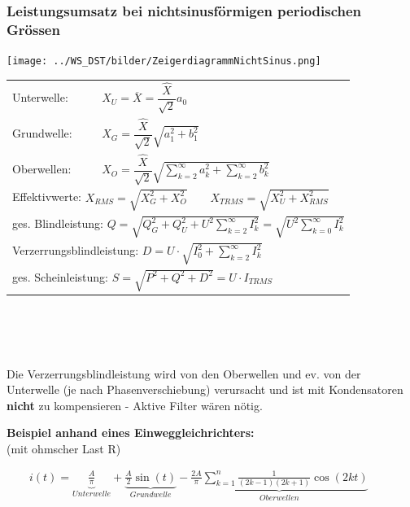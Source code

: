 		\subsubsection{Leistungsumsatz bei nichtsinusf\"ormigen periodischen Gr\"ossen}
		\begin{minipage}[c]{7.5cm}
			\texttt{[image: ../WS\_DST/bilder/ZeigerdiagrammNichtSinus.png]}     
    	\end{minipage}
		\begin{minipage}[c]{10.5cm}   
    		\noindent
    		\renewcommand{\arraystretch}{2.5}
    		\begin{tabular}{p{1.8cm} p{5.6cm}}
        		Unterwelle: 
        		& $X_{U} = \overline{X} = \dfrac{\hat{X}}{\sqrt{2}} a_0 \qquad $  \\
	     		Grundwelle: 
	     		& $X_{G} = \dfrac{\hat{X}}{\sqrt{2}} \sqrt{a_1^2 + b_1^2} \qquad  $   \\
	     		Oberwellen: 
	     		& $X_{O} = \dfrac{\hat{X}}{\sqrt{2}}
	     		\sqrt{\sum\limits_{k=2}^{\infty}a_k^2 +\sum\limits_{k=2}^{\infty}b_k^2}
	     		\qquad $  \\ \multicolumn{2}{l}{Effektivwerte: $X_{RMS} = \sqrt{X_G^2 + X_O^2} \qquad X_{TRMS} =
	     		\sqrt{X_U^2 + X_{RMS}^2}$ } \\
		\multicolumn{2}{l}{ges. Blindleistung: $Q = \sqrt{Q_G^2 + Q_U^2 + U^2
		\sum\limits_{k=2}^{\infty}I_k^2} = \sqrt{U^2 \sum\limits_{k=0}^{\infty}I_k^2}$} \\ 
		\multicolumn{2}{l}{Verzerrungsblindleistung: $D = U
		\cdot \sqrt{I_0^2 + \sum\limits_{k=2}^{\infty}I_k^2}$} \\
		\multicolumn{2}{l}{ges. Scheinleistung: $S = \sqrt{P^2 + Q^2 + D^2} = U \cdot I_{TRMS}$} \\
		 \end{tabular} \\
		 \renewcommand{\arraystretch}{1}
     	\end{minipage}    		\\ \\
     	Die Verzerrungsblindleistung wird von den Oberwellen und ev. von der Unterwelle (je
     	nach Phasenverschiebung) verursacht und ist mit Kondensatoren \textbf{nicht} zu kompensieren -
     	Aktive Filter w\"aren n\"otig.
		\\		
		
	\begin{minipage}[c]{8cm} 
	   \textbf{Beispiel anhand eines Einweggleichrichters:}	  	\\
	   (mit ohmscher Last R) 
	\end{minipage}   
	\begin{minipage}[c]{10cm} 	
	   $ \qquad i(t) = \underbrace{\frac{A}{\pi}}_{Unterwelle} + \underbrace{\frac{A}{2}
	   \sin(t)}_{Grundwelle} - \underbrace{\frac{2A}{\pi} \sum\limits_{k=1}^n \frac{1}{(2k-1)(2k+1)} \cos(2kt)}_{Oberwellen} $
	\end{minipage}   
		
